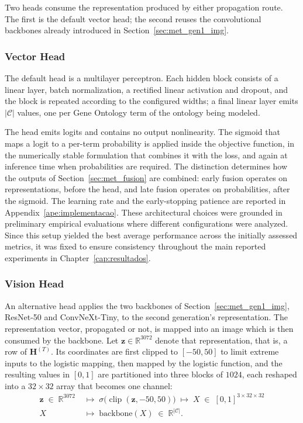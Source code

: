 \documentclass[Ingles]{ic-tese-v3}
\begin{document}
Two heads consume the representation produced by either propagation route. The first is the default
vector head; the second reuses the convolutional backbones already introduced in
Section~\ref{sec:met_gen1_img}.

\subsubsection{Vector Head}
\label{sec:met_head_vetor}

The default head is a multilayer perceptron. Each hidden block consists of a linear layer, batch
normalization, a rectified linear activation and dropout, and the block is repeated according to the
configured widths; a final linear layer emits $|\mathcal{C}|$ values, one per Gene Ontology term of
the ontology being modeled.

The head emits logits and contains no output nonlinearity. The sigmoid that maps a logit to a
per-term probability is applied inside the objective function, in the numerically stable formulation
that combines it with the loss, and again at inference time when probabilities are required. The
distinction determines how the outputs of Section~\ref{sec:met_fusion} are combined: early fusion
operates on representations, before the head, and late fusion operates on probabilities, after the
sigmoid. The learning rate and the early-stopping patience are reported in
Appendix~\ref{ape:implementacao}. These architectural choices were grounded in preliminary
empirical evaluations where different configurations were analyzed. Since this setup yielded the
best average performance across the initially assessed metrics, it was fixed to ensure consistency
throughout the main reported experiments in Chapter~\ref{cap:resultados}.

\subsubsection{Vision Head}
\label{sec:met_head_visao}

An alternative head applies the two backbones of Section~\ref{sec:met_gen1_img}, ResNet-50 and
ConvNeXt-Tiny, to the second generation's representation. The representation vector, propagated or
not, is mapped into an image which is then consumed by the backbone. Let
$\mathbf{z} \in \mathbb{R}^{3072}$ denote that representation, that is, a row of $\mathbf{H}^{(T)}$.
Its coordinates are first clipped to $[-50, 50]$ to limit extreme inputs to the logistic mapping, then mapped by the logistic function, and
the resulting values in $[0,1]$ are partitioned into three blocks of $1024$, each reshaped into a
$32 \times 32$ array that becomes one channel:
\begin{equation}
\begin{split}
  \mathbf{z} \;\in\; \mathbb{R}^{3072} \;&\longmapsto\; \sigma\!\bigl(\operatorname{clip}(\mathbf{z}, -50, 50)\bigr) \;\longmapsto\; X \;\in\; [0,1]^{3 \times 32 \times 32} \\
  X \;&\longmapsto\; \text{backbone}(X) \;\in\; \mathbb{R}^{|\mathcal{C}|}.
\end{split}
\label{eq:met_reshape}
\end{equation}
\end{document}
